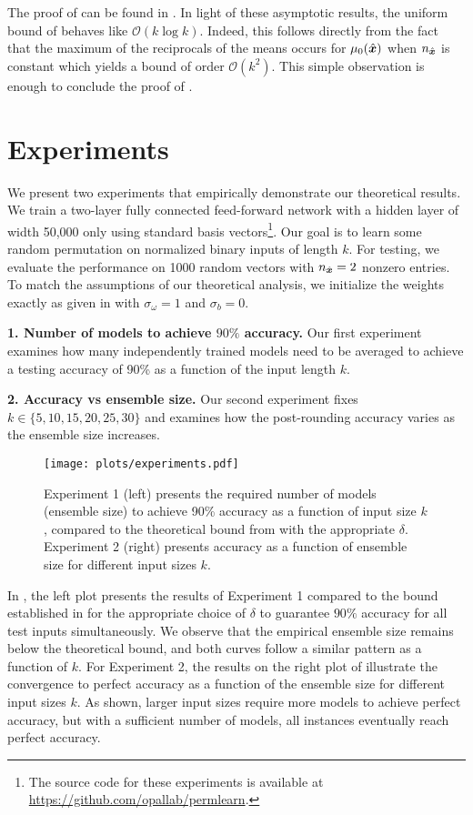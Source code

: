The proof of  can be found in . In light of these asymptotic results, the uniform bound of  behaves like $\mathcal{O}(k\log k)$. Indeed, this follows directly from the fact that the maximum of the reciprocals of the means occurs for $\mu_0(\hat{\boldsymbol{x}})$ when $n_{\hat{\boldsymbol{x}}}$ is constant which yields a bound of order $\mathcal{O}(k^2)$. This simple observation is enough to conclude the proof of .

\section{Experiments}
We present two experiments that empirically demonstrate our theoretical results. We train a two-layer fully connected feed-forward network with a hidden layer of width 50,000 only using standard basis vectors\footnote{The source code for these experiments is available at \href{https://github.com/opallab/permlearn}{https://github.com/opallab/permlearn}.}. Our goal is to learn some random permutation on normalized binary inputs of length $k$. For testing, we evaluate the performance on 1000 random vectors with $n_{\hat{\boldsymbol{x}}}=2$ nonzero entries. To match the assumptions of our theoretical analysis, we initialize the weights exactly as given in  with $\sigma_\omega=1$ and $\sigma_b = 0$. 

\textbf{1. Number of models to achieve $90\%$ accuracy.}
Our first experiment examines how many independently trained models need to be averaged to achieve a testing accuracy of 90\% as a function of the input length $k$.

\textbf{2. Accuracy vs ensemble size.}
Our second experiment fixes $k\in\{5, 10, 15, 20, 25, 30\}$ and examines how the post-rounding accuracy varies as the ensemble size increases.

\begin{figure}[h]
    \centering
    \texttt{[image: plots/experiments.pdf]}
    \caption{Experiment 1 (left) presents the required number of models (ensemble size) to achieve 90\% accuracy as a function of input size $k$, compared to the theoretical bound from  with the appropriate $\delta$. Experiment 2 (right) presents accuracy as a function of ensemble size for different input sizes $k$. }
    \label{fig:experiments}
\end{figure}

In , the left plot presents the results of Experiment 1 compared to the bound established in  for the appropriate choice of $\delta$ to guarantee $90\%$ accuracy for all test inputs simultaneously. We observe that the empirical ensemble size remains below the theoretical bound, and both curves follow a similar pattern as a function of $k$. For Experiment 2, the results on the right plot of  illustrate the convergence to perfect accuracy as a function of the ensemble size for different input sizes $k$. As shown, larger input sizes require more models to achieve perfect accuracy, but with a sufficient number of models, all instances eventually reach perfect accuracy.

